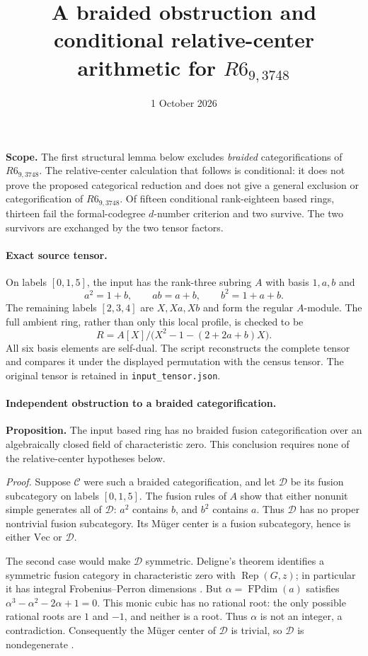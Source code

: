 \documentclass[11pt]{article}
\title{A braided obstruction and conditional relative-center arithmetic
for $R6_{9,3748}$}
\author{}\date{1 October 2026}
\begin{document}
\maketitle

\noindent\textbf{Scope.} The first structural lemma below excludes
\emph{braided} categorifications of $R6_{9,3748}$. The relative-center
calculation that follows is conditional: it does not prove the proposed
categorical reduction and does not give a general exclusion or
categorification of $R6_{9,3748}$.
Of fifteen conditional rank-eighteen based rings, thirteen fail the
formal-codegree $d$-number criterion and two survive. The two survivors
are exchanged by the two tensor factors.

\paragraph{Exact source tensor.}
On labels $[0,1,5]$, the input has the rank-three subring $A$ with basis
$1,a,b$ and
\[
 a^2=1+b,\qquad ab=a+b,\qquad b^2=1+a+b.
\]
The remaining labels $[2,3,4]$ are $X,Xa,Xb$ and form the regular
$A$-module. The full ambient ring, rather than only this local profile,
is checked to be
\[
 R=A[X]/\bigl(X^2-1-(2+2a+b)X\bigr).
\]
All six basis elements are self-dual. The script reconstructs the
complete tensor and compares it under the displayed permutation with
the census tensor. The original tensor is retained in
\texttt{input\_tensor.json}.

\paragraph{Independent obstruction to a braided categorification.}
\textbf{Proposition.} The input based ring has no braided fusion
categorification over an algebraically closed field of characteristic
zero. This conclusion requires none of the relative-center hypotheses
below.

\emph{Proof.} Suppose $\mathcal C$ were such a braided categorification,
and let $\mathcal D$ be its fusion subcategory on labels $[0,1,5]$.
The fusion rules of $A$ show that either nonunit simple generates all
of $\mathcal D$: $a^2$ contains $b$, and $b^2$ contains $a$.
Thus $\mathcal D$ has no proper nontrivial fusion subcategory.
Its M\"uger center is a fusion subcategory, hence is either
$\mathrm{Vec}$ or $\mathcal D$.

The second case would make $\mathcal D$ symmetric. Deligne's theorem
identifies a symmetric fusion category in characteristic zero with
$\operatorname{Rep}(G,z)$; in particular it has integral Frobenius--Perron
dimensions \cite[Theorem 2.43 and Corollary 2.46]{DGNO}.
But $\alpha=\operatorname{FPdim}(a)$ satisfies
$\alpha^3-\alpha^2-2\alpha+1=0$. This monic cubic has no rational
root: the only possible rational roots are $1$ and $-1$, and neither
is a root. Thus $\alpha$ is not an integer, a contradiction.
Consequently the M\"uger center of $\mathcal D$ is trivial, so
$\mathcal D$ is nondegenerate \cite[Theorem 3.4]{DGNO}.
\end{document}
